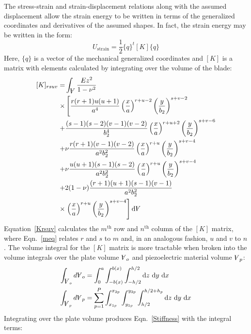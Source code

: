\documentclass[thesis]{fputhesis}
\newcommand{\Vol}{\rotatebox[origin=c]{180}{\ensuremath{A}}}
\begin{document}
\begin{body}
\begin{appendices}
The stress-strain and strain-displacement relations along with the assumed displacement allow the strain energy to be written in terms of the generalized coordinates and derivatives of the assumed shapes. In fact, the strain energy may be written in the form:
\begin{equation}
U_{\text{strain}}=\frac{1}{2}\{q\}^t [K] \{q\}
\end{equation}
Here, $\{q\}$ is a vector of the mechanical generalized coordinates and $[K]$ is a matrix with elements calculated by integrating over the volume of the blade:
\begin{equation}\label{Krsuv}
\begin{split}
[K]_{rsuv}=&\int_{\Vol} \frac{Ez^2}{1-\nu^2} \\
\times &\left[\frac{r(r+1)u(u+1)}{a^4}\left(\frac{x}{a}\right)^{r+u-2}\left(\frac{y}{b_2}\right)^{s+v-2}\right. \\
+&\frac{(s-1)(s-2)(v-1)(v-2)}{b_2^4}\left(\frac{x}{a}\right)^{r+u+2}\left(\frac{y}{b_2}\right)^{s+v-6} \\
+&\nu \frac{r(r+1)(v-1)(v-2)}{a^2 b_2^2} \left(\frac{x}{a}\right)^{r+u}\left(\frac{y}{b_2}\right)^{s+v-4} \\
+&\nu \frac{u(u+1)(s-1)(s-2)}{a^2 b_2^2} \left(\frac{x}{a}\right)^{r+u}\left(\frac{y}{b_2}\right)^{s+v-4} \\
+&2(1-\nu) \frac{(r+1)(u+1)(s-1)(v-1)}{a^2 b_2^2} \\
\times &\left. \left(\frac{x}{a}\right)^{r+u}\left(\frac{y}{b_2}\right)^{s+v-4} \right] \text{d}\Vol
\end{split}
\end{equation}
Equation~\eqref{Krsuv} calculates the $m^{\text{th}}$ row and $n^{\text{th}}$ column of the $[K]$ matrix, where Eqn.~\eqref{meq} relates $r$ and $s$ to $m$ and, in an analogous fashion, $u$ and $v$ to $n$. The volume integral for the $[K]$ matrix is more tractable when broken into the volume integrals over the plate volume $\Vol_o$ and piezoelectric material volume $\Vol_p$:
\begin{align}
\int_{\Vol_o} d\Vol_o &=\int_0^a \int_{-b(x)}^{b(x)} \int_{-h/2}^{h/2} \text{d}z\ \text{d}y \ \text{d}x \\
\int_{\Vol_p} d\Vol_p &=\sum_{p=1}^P \int_{x_{1p}}^{x_{2p}} \int_{y_{1p}}^{y_{2p}} \int_{h/2}^{h/2+h_p} \text{d}z\ \text{d}y \ \text{d}x
\end{align}
Integrating over the plate volume produces Eqn.~\eqref{Stiffness} with the integral terms:
\begin{align}\label{Stiffness2}

\end{align}
\end{appendices}
\end{body}
\end{document}
